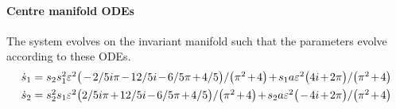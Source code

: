 \paragraph{Centre manifold ODEs} 
The system evolves on the invariant manifold such
that the parameters evolve according to these ODEs.
\begin{align*}&
\dot s_{1}=\ParMath{s_{2} s_{1}^{2} \eps^{2} \big(-2/5 i \pi -12/5 i-6/5 \pi +4/5
\big)/\big(\pi ^{2}+4\big)+s_{1} a \eps^{2} \big(4 i+2 \pi \big)/\big(
\pi ^{2}+4\big)}
\\&
\dot s_{2}=\ParMath{s_{2}^{2} s_{1} \eps^{2} \big(2/5 i \pi +12/5 i-6/5 \pi +4/5
\big)/\big(\pi ^{2}+4\big)+s_{2} a \eps^{2} \big(-4 i+2 \pi \big)/\big(
\pi ^{2}+4\big)}
\end{align*}


